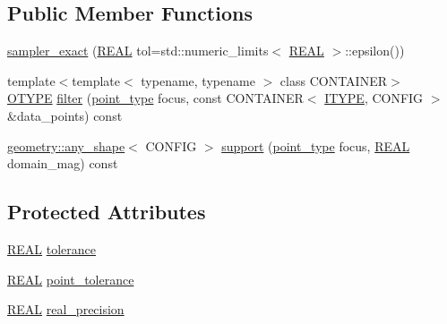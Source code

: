 \subsection*{Public Member Functions}
\begin{DoxyCompactItemize}
\item 
\hyperlink{classmui_1_1sampler__exact_a18387cac7ef30f2b2db31eefee9e02cd}{sampler\+\_\+exact} (\hyperlink{classmui_1_1sampler__exact_a204186f8735dcdfe021c7e3a36a077bf}{R\+E\+AL} tol=std\+::numeric\+\_\+limits$<$ \hyperlink{classmui_1_1sampler__exact_a204186f8735dcdfe021c7e3a36a077bf}{R\+E\+AL} $>$\+::epsilon())
\item 
{\footnotesize template$<$template$<$ typename, typename $>$ class C\+O\+N\+T\+A\+I\+N\+ER$>$ }\\\hyperlink{classmui_1_1sampler__exact_a7543e4be38b14fb93d07b34ee4e33f4d}{O\+T\+Y\+PE} \hyperlink{classmui_1_1sampler__exact_a9e35d2b8d145010125c2fd45033d7957}{filter} (\hyperlink{classmui_1_1sampler__exact_a789e8bf4cf1dd6319c67ab7a60458948}{point\+\_\+type} focus, const C\+O\+N\+T\+A\+I\+N\+ER$<$ \hyperlink{classmui_1_1sampler__exact_a4198aa2cc7c945895db91aae2b6cc0b2}{I\+T\+Y\+PE}, C\+O\+N\+F\+IG $>$ \&data\+\_\+points) const
\item 
\hyperlink{classmui_1_1geometry_1_1any__shape}{geometry\+::any\+\_\+shape}$<$ C\+O\+N\+F\+IG $>$ \hyperlink{classmui_1_1sampler__exact_af7ea697c027c0e082087dae5e57959ca}{support} (\hyperlink{classmui_1_1sampler__exact_a789e8bf4cf1dd6319c67ab7a60458948}{point\+\_\+type} focus, \hyperlink{classmui_1_1sampler__exact_a204186f8735dcdfe021c7e3a36a077bf}{R\+E\+AL} domain\+\_\+mag) const
\end{DoxyCompactItemize}
\subsection*{Protected Attributes}
\begin{DoxyCompactItemize}
\item 
\hyperlink{classmui_1_1sampler__exact_a204186f8735dcdfe021c7e3a36a077bf}{R\+E\+AL} \hyperlink{classmui_1_1sampler__exact_a76c2cb56624e36ddb2a22c28cc8c9dbb}{tolerance}
\item 
\hyperlink{classmui_1_1sampler__exact_a204186f8735dcdfe021c7e3a36a077bf}{R\+E\+AL} \hyperlink{classmui_1_1sampler__exact_a2f0fa42e305d801cfe9bce62b5d0b097}{point\+\_\+tolerance}
\item 
\hyperlink{classmui_1_1sampler__exact_a204186f8735dcdfe021c7e3a36a077bf}{R\+E\+AL} \hyperlink{classmui_1_1sampler__exact_a8bc66e3304c7de677e88b24b9cb3cfbb}{real\+\_\+precision}
\end{DoxyCompactItemize}


